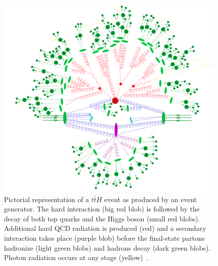 \begin{figure}[p]
  \centering
  \includegraphics[width=\textwidth, clip=true, trim=0 0 0 0]
  {figs/mc_gen/full_mc_event.png}
  \caption[
    Pictorial representation of a $t\bar{t}H$ event as produced by an event
    generator~\cite{Gleisberg:2008ta}.
  ]{
    Pictorial representation of a $t\bar{t}H$ event as produced by an event
    generator.
    The hard interaction (big red blob) is followed by the decay of both top
    quarks and the Higgs boson (small red blobs).
    Additional hard QCD radiation is produced (red) and a secondary
    interaction takes place (purple blob) before the final-state partons
    hadronize (light green blobs) and hadrons decay (dark green blobs).
    Photon radiation occurs at any stage (yellow)~\cite{Gleisberg:2008ta}.
  }
  \label{fig:mc_event}
\end{figure}

